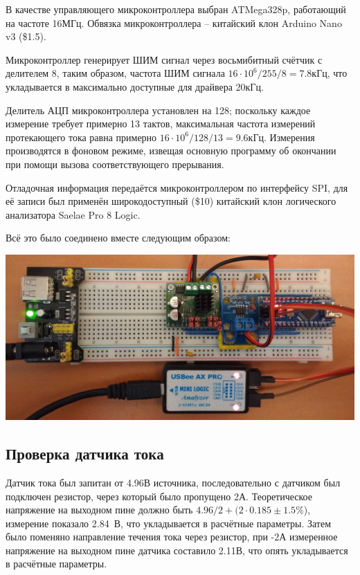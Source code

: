 \documentclass{scrartcl}
\begin{document}

В качестве управляющего микроконтроллера выбран ATMega328p, работающий на частоте 16МГц. Обвязка микроконтроллера -- китайский клон Arduino Nano v3 (\$1.5).

Микроконтроллер генерирует ШИМ сигнал через восьмибитный счётчик с делителем 8, таким образом, частота ШИМ сигнала $16\cdot 10^6 /255 /8 = 7.8$кГц, что укладывается в максимально доступные для драйвера 20кГц.

Делитель АЦП микроконтроллера установлен на 128; поскольку каждое измерение требует примерно 13 тактов, максимальная частота измерений протекающего тока равна примерно $16\cdot 10^6 / 128 / 13 = 9.6$кГц. Измерения производятся в фоновом режиме, извещая основную программу об окончании при помощи вызова соответствующего прерывания.


Отладочная информация передаётся микроконтроллером по интерфейсу SPI, для её записи был применён широкодоступный (\$10) китайский клон логического анализатора Saelae Pro 8 Logic.

Всё это было соединено вместе следующим образом:

\centerline{
\includegraphics[width=.8\linewidth]{Fig/board.jpg}
}


\subsection{Проверка датчика тока}
Датчик тока был запитан от 4.96В источника, последовательно с датчиком был подключен резистор, через который было пропущено 2А. Теоретическое напряжение на выходном пине должно быть $4.96/2 + (2 \cdot 0.185 \pm 1.5\%$), измерение показало 2.84~В, что укладывается в расчётные параметры.
Затем было поменяно направление течения тока через резистор, при -2А
измеренное напряжение на выходном пине датчика составило 2.11В, что опять укладывается в расчётные параметры.
    
\end{document}

